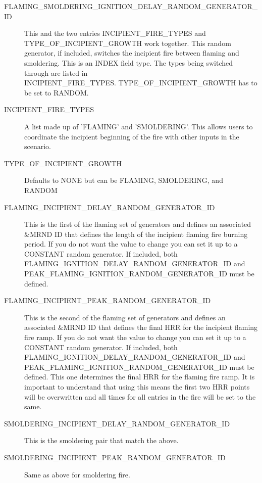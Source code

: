 \documentclass[12pt,twoside]{book}
\begin{document}
 \begin{description}
  \item[FLAMING\_SMOLDERING\_IGNITION\_DELAY\_RANDOM\_GENERATOR\_ID] This and the two entries {\ct INCIPIENT\_FIRE\_TYPES} and {\ct TYPE\_OF\_INCIPIENT\_GROWTH} work together. This random generator, if included, switches the incipient fire between flaming and smoldering. This is an {\ct INDEX} field type. The types being switched through are listed in \\
   { \ct INCIPIENT\_FIRE\_TYPES}. {\ct TYPE\_OF\_INCIPIENT\_GROWTH} has to be set to {\ct RANDOM}.
  \item[INCIPIENT\_FIRE\_TYPES] A list made up of 'FLAMING' and 'SMOLDERING'. This allows users to coordinate the incipient beginning of the fire with other inputs in the scenario.
  \item[TYPE\_OF\_INCIPIENT\_GROWTH] Defaults to {\ct NONE} but can be {\ct FLAMING}, {\ct SMOLDERING}, and {\ct RANDOM}
  \item[FLAMING\_INCIPIENT\_DELAY\_RANDOM\_GENERATOR\_ID] This is the first of the flaming set of generators and defines an associated {\ct \&MRND} ID that defines the length of the incipient flaming fire burning period. If you do not want the value to change you can set it up to a {\ct CONSTANT} random generator. If included, both \\
      {\ct FLAMING\_IGNITION\_DELAY\_RANDOM\_GENERATOR\_ID} and \\
      {\ct PEAK\_FLAMING\_IGNITION\_RANDOM\_GENERATOR\_ID} must be defined.
  \item[FLAMING\_INCIPIENT\_PEAK\_RANDOM\_GENERATOR\_ID] This is the second of the flaming set of generators and defines an associated {\ct \&MRND} ID that defines the final HRR for the incipient flaming fire ramp. If you do not want the value to change you can set it up to a {\ct CONSTANT} random generator. If included, both \\
      {\ct FLAMING\_IGNITION\_DELAY\_RANDOM\_GENERATOR\_ID} and \\
      {\ct PEAK\_FLAMING\_IGNITION\_RANDOM\_GENERATOR\_ID} must be defined. This one determines the final HRR for the flaming fire ramp. It is important to understand that using this means the first two HRR points will be overwritten and all times for all entries in the fire will be set to the same.
  \item[SMOLDERING\_INCIPIENT\_DELAY\_RANDOM\_GENERATOR\_ID] This is the smoldering pair that match the above.
  \item[SMOLDERING\_INCIPIENT\_PEAK\_RANDOM\_GENERATOR\_ID] Same as above for smoldering fire.

\end{description}
\end{document}
